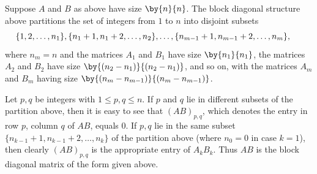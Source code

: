 \begin{Solution}
Suppose $A$ and $B$ as above have size $\by{n}{n}$. The block diagonal structure above partitions the set of integers from $1$ to $n$ into disjoint subsets
\[
\hspace*{-.2in}\{1, 2, \dots, n_1\}, \{n_1 + 1, n_1 + 2, \dots, n_2\}, \dots, \{n_{m-1}+ 1, n_{m-1} + 2,\dots, n_m\},
\]
where $n_m = n$ and the matrices $A_1$ and $B_1$ have size $\by{n_1}{n_1}$, the matrices $A_2$ and $B_2$ have size
$\by{(n_2 - n_1)}{(n_2 - n_1)}$, and so on, with the matrices $A_m$ and $B_m$ having size $\by{(n_m - n_{m-1})}{(n_m - n_{m-1})}$.

Let $p, q$ be integers with $1 \le p, q \le n$. If $p$ and $q$ lie in different subsets of the partition above, then it is easy to see that $(AB)_{p, q}$, which denotes the entry in row $p$, column $q$ of $AB$, equals $0$. If $p, q$ lie in the same subset
$\{n_{k-1} + 1, n_{k-1} + 2, \dots, n_k\}$ of the partition above (where $n_0 = 0$ in case $k = 1$), then clearly $(AB)_{p, q}$ is the appropriate entry of $A_k B_k$. Thus $AB$ is the block diagonal matrix of the form given above.
\end{Solution}

